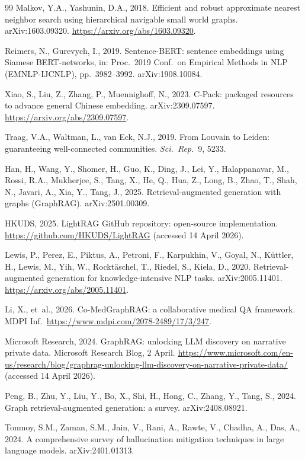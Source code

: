 \documentclass[12pt,a4paper,oneside]{report}
\begin{document}
\begin{thebibliography}{99}
Malkov, Y.A., Yashunin, D.A., 2018. Efficient and robust approximate
nearest neighbor search using hierarchical navigable small world
graphs. arXiv:1603.09320.
\url{https://arxiv.org/abs/1603.09320}.

Reimers, N., Gurevych, I., 2019. Sentence-BERT: sentence embeddings
using Siamese BERT-networks, in: Proc.\ 2019 Conf.\ on Empirical
Methods in NLP (EMNLP-IJCNLP), pp.\ 3982--3992.
arXiv:1908.10084.

Xiao, S., Liu, Z., Zhang, P., Muennighoff, N., 2023. C-Pack: packaged
resources to advance general Chinese embedding. arXiv:2309.07597.
\url{https://arxiv.org/abs/2309.07597}.

Traag, V.A., Waltman, L., van Eck, N.J., 2019. From Louvain to Leiden:
guaranteeing well-connected communities. \textit{Sci.\ Rep.}\ 9, 5233.

Han, H., Wang, Y., Shomer, H., Guo, K., Ding, J., Lei, Y.,
Halappanavar, M., Rossi, R.A., Mukherjee, S., Tang, X., He, Q., Hua,
Z., Long, B., Zhao, T., Shah, N., Javari, A., Xia, Y., Tang, J., 2025.
Retrieval-augmented generation with graphs (GraphRAG).
arXiv:2501.00309.

HKUDS, 2025. LightRAG GitHub repository: open-source implementation.
\url{https://github.com/HKUDS/LightRAG} (accessed 14 April 2026).

Lewis, P., Perez, E., Piktus, A., Petroni, F., Karpukhin, V., Goyal,
N., K\"{u}ttler, H., Lewis, M., Yih, W., Rockt\"{a}schel, T., Riedel,
S., Kiela, D., 2020. Retrieval-augmented generation for
knowledge-intensive NLP tasks. arXiv:2005.11401.
\url{https://arxiv.org/abs/2005.11401}.

Li, X., et~al., 2026. Co-MedGraphRAG: a collaborative medical QA
framework. MDPI Inf.\
\url{https://www.mdpi.com/2078-2489/17/3/247}.

Microsoft Research, 2024. GraphRAG: unlocking LLM discovery on
narrative private data. Microsoft Research Blog, 2 April.
\url{https://www.microsoft.com/en-us/research/blog/graphrag-unlocking-llm-discovery-on-narrative-private-data/}
(accessed 14 April 2026).

Peng, B., Zhu, Y., Liu, Y., Bo, X., Shi, H., Hong, C., Zhang, Y., Tang,
S., 2024. Graph retrieval-augmented generation: a survey.
arXiv:2408.08921.

Tonmoy, S.M., Zaman, S.M., Jain, V., Rani, A., Rawte, V., Chadha, A.,
Das, A., 2024. A comprehensive survey of hallucination mitigation
techniques in large language models. arXiv:2401.01313.


\end{thebibliography}
\end{document}
